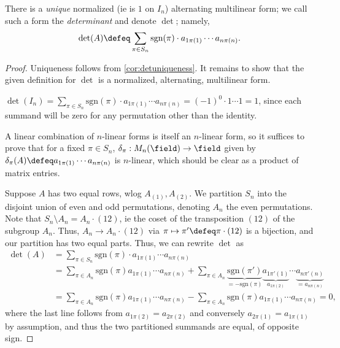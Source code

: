 \begin{theorem}\label{thm:determinant}
    There is a \emph{unique} normalized (ie is $1$ on $I_n$) alternating multilinear form; we call such a form the \emph{determinant} and denote $\det$; namely, \[
    \det(A)\defeq \sum_{\pi \in S_n}  \text{sgn}(\pi) \cdot a_{1 \pi(1)} \cdots a_{n \pi(n)}.
    \]
\end{theorem}
\begin{proof}
    Uniqueness follows from \cref{cor:detuniqueness}. It remains to show that the given definition for $\det$ is a normalized, alternating, multilinear form.
    
     $\det(I_n) = \sum_{ \pi \in S_n} \text{sgn}(\pi) \cdot a_{1 \pi(1)} \cdots a_{n \pi(n)} =(-1)^0 \cdot  1 \cdots 1 = 1$, since each summand will be zero for any permutation other than the identity.

     A linear combination of $n$-linear forms is itself an $n$-linear form, so it suffices to prove that for a fixed $\pi \in S_n$, $\delta_\pi : M_n(\field) \to \field$ given by $\delta_\pi (A) \defeq a_{1 \pi(1)} \cdots a_{n \pi (n)}$ is $n$-linear, which should be clear as a product of matrix entries.

     Suppose $A$ has two equal rows, wlog $A_{(1)}, A_{(2)}$. We partition $S_n$ into the disjoint union of even and odd permutations, denoting $A_n$ the even permutations. Note that $S_n \setminus A_n = A_n \cdot (12)$, ie the coset of the transposition $(12)$ of the subgroup $A_n$. Thus, $A_n \to A_n \cdot (12)$ via $\pi \mapsto \pi' \defeq \pi \cdot (12)$ is a bijection, and our partition has two equal parts. Thus, we can rewrite $\det$ as \begin{align*}
        \det(A) &=\sum_{\pi \in S_n}  \text{sgn}(\pi) \cdot a_{1 \pi(1)} \cdots a_{n \pi(n)} \\
        &= \sum_{\pi \in A_n} \text{sgn}(\pi) a_{1 \pi(1)} \cdots a_{n\pi(n)} + \sum_{\pi \in A_n} \underbrace{\text{sgn}(\pi')}_{=- \text{sgn}(\pi)} \underbrace{a_{1 \pi'(1)}}_{a_{1 \pi(2)}}\cdots \underbrace{a_{n\pi'(n)}}_{= a_{n \pi(n)}}\\
        &= \sum_{\pi \in A_n} \text{sgn}(\pi) a_{1 \pi(1)} \cdots a_{n\pi(n)} - \sum_{\pi \in A_n} \text{sgn}(\pi) a_{1 \pi(1)} \cdots a_{n\pi(n)} = 0,
    \end{align*}
    where the last line follows from $a_{1 \pi(2)} = a_{2 \pi(2)}$ and conversely $a_{2 \pi(1)} = a_{1 \pi(1)}$ by assumption, and thus the two partitioned summands are equal, of opposite sign.
\end{proof}

